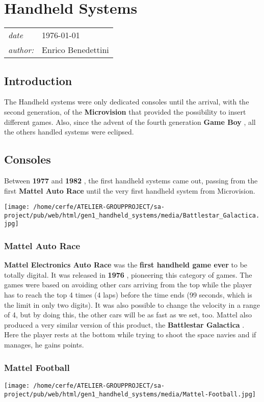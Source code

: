 \documentclass[a4paper,10pt]{book}
\newcommand{\pageHeader}[4]{
    \section{#1}
    \vspace{-0.3cm}
    \begin{table}[h!]
     \begin{tabular}{ll}
        \hline
        \textit{date} & #2 \\
        \textit{author: } & #3\\
        \hline
     \end{tabular}
    \end{table}
    \vspace{-0.3cm}
}
\begin{document}
 \newpage\pageHeader{Handheld Systems}{1976-01-01}{Enrico Benedettini}{The first handheld consoles ever.}
 \subsection{Introduction }
 
          The Handheld systems were only dedicated consoles until the arrival, with the second generation, of
          the  \textbf{Microvision }  that provided the possibility to insert different games. Also, since the advent of
          the fourth generation  \textbf{Game Boy } , all the others handled systems were eclipsed.  
 
 
 \subsection{Consoles }
 
          Between  \textbf{1977 }  and  \textbf{1982 } , the first handheld systems came out, passing from the first
           \textbf{Mattel Auto Race }  until the very first handheld system from Microvision.
         
 
 \texttt{[image: /home/cerfe/ATELIER-GROUPPROJECT/sa-project/pub/web/html/gen1\_handheld\_systems/media/Battlestar\_Galactica.jpg]}
 \subsubsection{Mattel Auto Race }
 
 \textbf{Mattel Electronics Auto Race }  was the  \textbf{first handheld game ever }  to be totally digital.
            It was released in  \textbf{1976 } , pioneering this category of games. The games were based on avoiding other cars
            arriving from the top while the player has to reach the top 4 times (4 laps) before the time ends (99 seconds,
            which is the limit in only two digits). It was also possible to change the velocity in a range of 4, but by doing
            this, the other cars will be as fast as we set, too.  
            Mattel also produced a very similar version of this product, the  \textbf{Battlestar Galactica } .
            Here the player rests at the bottom while trying to shoot the space navies and if manages, he gains points.
           
 
 
 
 \subsubsection{Mattel Football }
 \texttt{[image: /home/cerfe/ATELIER-GROUPPROJECT/sa-project/pub/web/html/gen1\_handheld\_systems/media/Mattel-Football.jpg]}
 
\end{document}
